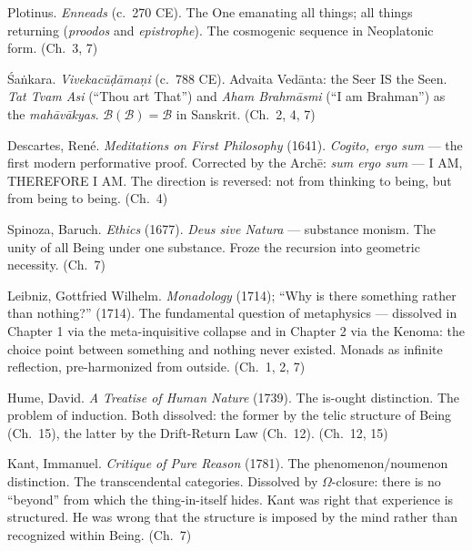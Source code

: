 \documentclass[10pt, openany, oneside]{book}
\begin{document}
{\vspace{0.3em}

\noindent Plotinus. \textit{Enneads} (c.\ 270 CE). The One emanating all things; all things returning (\textit{proodos} and \textit{epistrophe}). The cosmogenic sequence in Neoplatonic form. (Ch.\ 3, 7)

\vspace{0.3em}

\noindent \'{S}a\.{n}kara. \textit{Vivekac\={u}\d{d}\={a}ma\d{n}i} (c.\ 788 CE). Advaita Ved\={a}nta: the Seer IS the Seen. \textit{Tat Tvam Asi} (``Thou art That'') and \textit{Aham Brahm\={a}smi} (``I am Brahman'') as the \textit{mah\={a}v\={a}kyas}. $\mathcal{B}(\mathcal{B}) = \mathcal{B}$ in Sanskrit. (Ch.\ 2, 4, 7)

\vspace{0.3em}

\noindent Descartes, Ren\'{e}. \textit{Meditations on First Philosophy} (1641). \textit{Cogito, ergo sum} --- the first modern performative proof. Corrected by the Arch\={e}: \textit{sum ergo sum} --- I AM, THEREFORE I AM. The direction is reversed: not from thinking to being, but from being to being. (Ch.\ 4)

\vspace{0.3em}

\noindent Spinoza, Baruch. \textit{Ethics} (1677). \textit{Deus sive Natura} --- substance monism. The unity of all Being under one substance. Froze the recursion into geometric necessity. (Ch.\ 7)

\vspace{0.3em}

\noindent Leibniz, Gottfried Wilhelm. \textit{Monadology} (1714); ``Why is there something rather than nothing?'' (1714). The fundamental question of metaphysics --- dissolved in Chapter 1 via the meta-inquisitive collapse and in Chapter 2 via the Kenoma: the choice point between something and nothing never existed. Monads as infinite reflection, pre-harmonized from outside. (Ch.\ 1, 2, 7)

\vspace{0.3em}

\noindent Hume, David. \textit{A Treatise of Human Nature} (1739). The is-ought distinction. The problem of induction. Both dissolved: the former by the telic structure of Being (Ch.\ 15), the latter by the Drift-Return Law (Ch.\ 12). (Ch.\ 12, 15)

\vspace{0.3em}

\noindent Kant, Immanuel. \textit{Critique of Pure Reason} (1781). The phenomenon/noumenon distinction. The transcendental categories. Dissolved by $\Omega$-closure: there is no ``beyond'' from which the thing-in-itself hides. Kant was right that experience is structured. He was wrong that the structure is imposed by the mind rather than recognized within Being. (Ch.\ 7)

}
\end{document}
